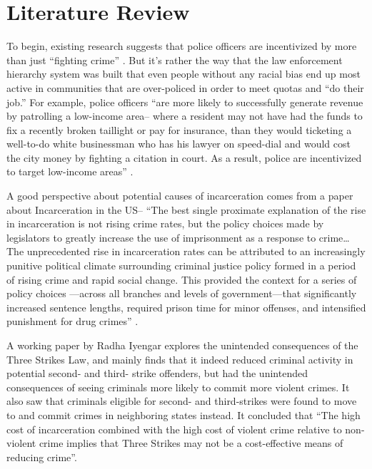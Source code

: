 \documentclass[12pt]{article}
\begin{document}
\section{Literature Review}
   To begin, existing research suggests that police officers are incentivized by more than just “fighting crime” \parencite{baicker2007finders}. But it’s rather the way that the law enforcement hierarchy system was built that even people without any racial bias end up most active in communities that are over-policed in order to meet quotas and “do their job.” For example, police officers “are more likely to successfully generate revenue by patrolling a low-income area-- where a resident may not have had the funds to fix a recently broken taillight or pay for insurance, than they would ticketing a well-to-do white businessman who has his lawyer on speed-dial and would cost the city money by fighting a citation in court. As a result, police are incentivized to target low-income areas” \parencite{hogan2023incentivizing}. 

    A good perspective about potential causes of incarceration comes from a paper about Incarceration in the US– “The best single proximate explanation of the rise in incarceration is not rising crime rates, but the policy choices made by legislators to greatly increase the use of imprisonment as a response to crime… The unprecedented rise in incarceration rates can be attributed to an increasingly punitive political climate surrounding criminal justice policy formed in a period of rising crime and rapid social change. This provided the context for a series of policy choices —across all branches and levels of government—that significantly increased sentence lengths, required prison time for minor offenses, and intensified punishment for drug crimes” \parencite{travis2014growth}.

    A working paper by Radha Iyengar explores the unintended consequences of the Three Strikes Law, and mainly finds that it indeed reduced criminal activity in potential second- and third- strike offenders, but had the unintended consequences of seeing criminals more likely to commit more violent crimes. It also saw that criminals eligible for second- and third-strikes were found to move to and commit crimes in neighboring states instead. It concluded that “The high cost of incarceration combined with the high cost of violent crime relative to non-violent crime implies that Three Strikes may not be a cost-effective means of reducing crime”\parencite{iyengar2008threestrikes}.
\end{document}

